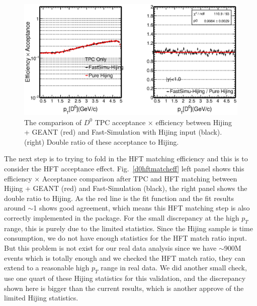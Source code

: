 \documentclass[a4paper]{article}
\begin{document}
\begin{figure}[htbp]
\centering
\includegraphics[keepaspectratio,width=1.0\textwidth]{fig/Physics_FastHijingVsPureHijing_TpcOnly2.eps}
\caption{The comparison of $D^0$ TPC acceptance $\times$ efficiency between Hijing + GEANT (red) and Fast-Simulation with Hijing input (black). (right) Double ratio of these acceptance to Hijing.}
\label{d0tpceff}
\end{figure}

The next step is to trying to fold in the HFT matching efficiency and this is to consider the HFT acceptance effect. Fig.~\ref{d0hftmatcheff} left panel shows this efficiency $\times$ Acceptance comparison after TPC and HFT matching between Hijing + GEANT (red) and Fast-Simulation (black), the right panel shows the double ratio to Hijing. As the red line is the fit function and the fit results around $\sim$1 shows good agreement, which means this HFT matching step is also correctly implemented in the package. For the small discrepancy at the high $p_T$ range, this is purely due to the limited statistics. Since the Hijing sample is time consumption, we do not have enough statistics for the HFT match ratio input. But this problem is not exist for our real data analysis since we have $\sim$900M events which is totally enough and we checked the HFT match ratio, they can extend to a reasonable high $p_T$ range in real data. We did another small check, use one quart of these Hijing statistics for this validation, and the discrepancy shown here is bigger than the current results, which is another approve of the limited Hijing statistics.
\end{document}
